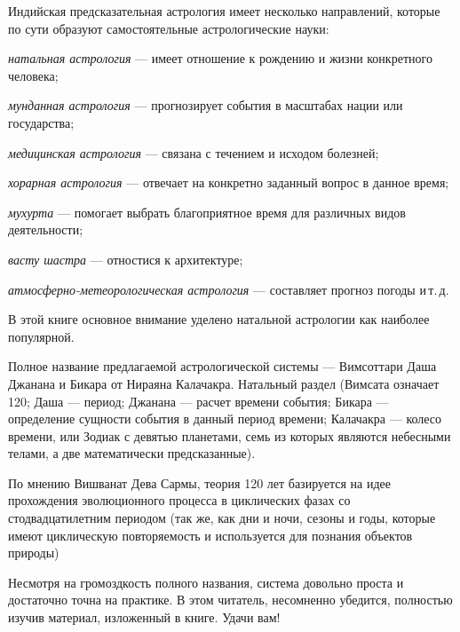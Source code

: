Индийская предсказательная астрология имеет несколько направлений, которые по сути образуют самостоятельные астрологические науки:

\begin{mylist}
	\item \emph{натальная астрология} --- имеет отношение к рождению и жизни конкретного человека;
	\item \emph{мунданная астрология} --- прогнозирует события в масштабах нации или государства;
	\item \emph{медицинская астрология} --- связана с течением и исходом болезней;
	\item \emph{хорарная астрология} --- отвечает на конкретно заданный вопрос в данное время;
	\item \emph{мухурта} --- помогает выбрать благоприятное время для различных видов деятельности;
	\item \emph{васту шастра} --- отностися к архитектуре;
	\item \emph{атмосферно-метеорологическая астрология} --- составляет прогноз погоды и\,т.\,д.
\end{mylist}

В этой книге основное внимание уделено натальной астрологии как наиболее популярной.

Полное название предлагаемой астрологической системы --- Вимсоттари Даша Джанана и Бикара от Нираяна Калачакра. Натальный раздел (Вимсата означает 120; Даша --- период; Джанана --- расчет времени события; Бикара --- определение сущности события в данный период времени; Калачакра --- колесо времени, или Зодиак с девятью планетами, семь из которых являются небесными телами, а две математически предсказанные).

По мнению Вишванат Дева Сармы, теория 120 лет базируется на идее прохождения эволюционного процесса в циклических фазах со стодвадцатилетним периодом (так же, как дни и ночи, сезоны и годы, которые имеют циклическую повторяемость и используется для познания объектов природы)

Несмотря на громоздкость полного названия, система довольно проста и достаточно точна на практике. В этом читатель, несомненно убедится, полностью изучив материал, изложенный в книге. Удачи вам!
